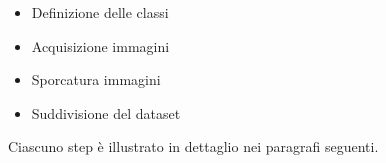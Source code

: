 \documentclass[14pt]{extarticle}
\begin{document}

	\begin{itemize}
	\item Definizione delle classi
	\item Acquisizione immagini
	\item Sporcatura immagini
	\item Suddivisione del dataset
	\end{itemize}
Ciascuno step è illustrato in dettaglio nei paragrafi seguenti.
\end{document}

